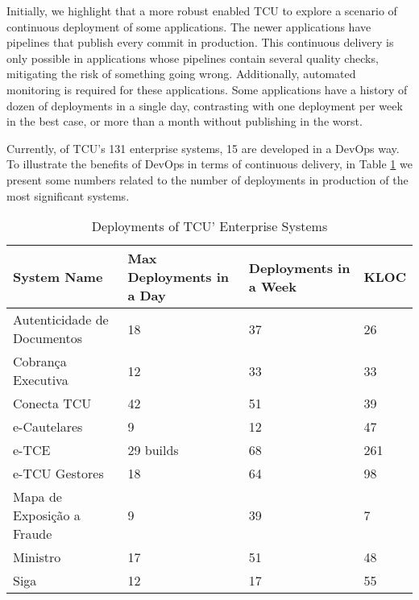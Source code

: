Initially, we highlight that a more robust \cc enabled TCU to explore a scenario
of continuous deployment of some applications. The newer applications have
pipelines that publish every commit in production. This continuous delivery is
only possible in applications whose pipelines contain several quality checks,
mitigating the risk of something going wrong. Additionally, automated monitoring
is required for these applications. Some applications have a history of dozen
of deployments in a single day, contrasting with one deployment per week in the
best case, or more than a month without publishing in the worst.

{
\color{blue}

Currently, of TCU's 131 enterprise systems, 15 are developed in a DevOps way.
To illustrate the benefits of DevOps in terms of continuous delivery, in Table
\ref{deployments_table} we present some numbers related to the number of deployments
in production of the most significant systems.

\begin{table}[hb!]
\centering
\begin{tabular}{|p{5.5cm}|p{3.5cm}|p{2.7cm}|p{1.5cm}|} \hline
{\bf System Name} & {\bf Max Deployments in a Day} & {\bf Deployments in a Week} & {\bf KLOC}\\ \hline
Autenticidade de Documentos & 18 & 37 & 26 \\ \hline
Cobrança Executiva & 12 & 33 & 33 \\ \hline
Conecta TCU & 42 & 51 & 39  \\ \hline
e-Cautelares & 9 & 12 & 47  \\ \hline
e-TCE & 29 builds & 68 & 261 \\ \hline
e-TCU Gestores & 18 & 64 & 98 \\ \hline
Mapa de Exposi\c{c}\~{a}o a Fraude & 9 & 39 & 7 \\ \hline
Ministro & 17 & 51 & 48 \\ \hline
Siga & 12 & 17 & 55 \\ \hline

\end{tabular}
\caption{Deployments of TCU' Enterprise Systems}
\label{deployments_table}
\end{table}

}



